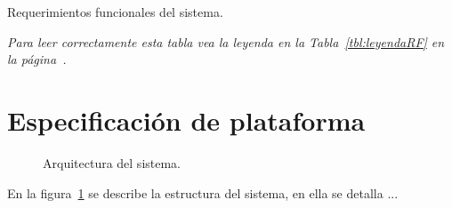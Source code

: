 \begin{table}[htbp!]
\begin{requerimientosU}
	\end{requerimientosU}
	\caption{Requerimientos funcionales del sistema.}
	{\footnotesize\em Para leer correctamente esta tabla vea la leyenda en la Tabla~\ref{tbl:leyendaRF} en la página~\pageref{tbl:leyendaRF}.}
	\label{tbl:reqFunc}
\end{table}



\section{Especificación de plataforma}	


\begin{figure}[htbp!]
	\begin{center}
		\caption{Arquitectura del sistema.}
		\label{fig:arquitectura}
	\end{center}
\end{figure}

En la figura~\ref{fig:arquitectura} se describe la estructura del sistema, en ella se detalla ...